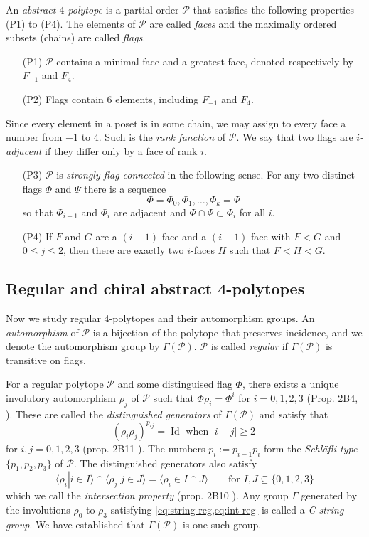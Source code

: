 \documentclass{article}
\theoremstyle{definition}
\newcommand{\p}{\mathcal{P}}
\DeclareMathOperator{\Id}{Id}
\begin{document}
	An \textit{abstract $4$-polytope} is a partial order $\p$ that satisfies the following properties (P1) to (P4). The elements of $\p$ are called \textit{faces} and the maximally ordered subsets (chains) are called \textit{flags}.
	\begin{enumerate}
		\item[(P1)]\label{P1} $\p$ contains a minimal face and a greatest face, denoted respectively by $F_{-1}$ and $F_4$.
		\item[(P2)]\label{P2} Flags contain $6$ elements, including $F_{-1}$ and $F_4$.
	\end{enumerate}
	Since every element in a poset is in some chain, we may assign to every face a number from $-1$ to $4$. Such is the \textit{rank function} of $\p$. We say that two flags are \textit{$i$-adjacent} if they differ only by a face of rank $i$.
	\begin{enumerate}
		\item[(P3)]\label{P3} $\p$ is \textit{strongly flag connected} in the following sense. For any two distinct flags $\Phi$ and $\Psi$ there is a sequence
		\[\Phi=\Phi_0,\Phi_1,\ldots,\Phi_k=\Psi\]
		so that $\Phi_{i-1}$ and $\Phi_i$ are adjacent and $\Phi\cap\Psi\subset\Phi_i$ for all $i$.
		\item[(P4)]\label{P4} If $F$ and $G$ are a $(i-1)$-face and a $(i+1)$-face with $F<G$ and $0\leq j\leq2$, then there are exactly two $i$-faces $H$ such that $F<H<G$.
	\end{enumerate}
	
		\subsection{Regular and chiral abstract 4-polytopes}
	Now we study regular 4-polytopes and their automorphism groups. An \textit{automorphism} of $\p$ is a bijection of the polytope that preserves incidence, and we denote the automorphism group by $\Gamma(\p)$. $\p$ is called \textit{regular} if $\Gamma(\p)$ is transitive on flags.
	
	For a regular polytope $\p$ and some distinguised flag $\Phi$, there exists a unique involutory automorphism $\rho_j$ of $\p$ such that $\Phi\rho_i=\Phi^i$ for $i=0,1,2,3$ (Prop. 2B4, \cite{abstract-polytopes}). These are called the \textit{distinguished generators} of $\Gamma(\p)$ and satisfy that 
	\begin{equation}\label{eq:string-reg}
			(\rho_i\rho_j)^{p_{ij}}=\Id\text{ when } |i-j|\geq2\
	\end{equation}
	for $i,j=0,1,2,3$ (prop. 2B11 \cite{abstract-polytopes}). The numbers $p_i:=p_{i-1}p_i$ form the \textit{Schläfli type} $\{p_1,p_2,p_3\}$ of $\p$. The distinguished generators also satisfy 
	\begin{equation}\label{eq:int-reg}
		\langle \rho_i|i\in I\rangle\cap\langle\rho_j|j\in J\rangle=\langle\rho_i\in I\cap J\rangle\qquad\text{for }I,J\subseteq\{0,1,2,3\}
	\end{equation}
	which we call the \textit{intersection property} (prop. 2B10 \cite{abstract-polytopes}). Any group $\Gamma$ generated by the involutions $\rho_0$ to $\rho_3$ satisfying \cref{eq:string-reg,eq:int-reg} is called a \textit{C-string group}. We have established that $\Gamma(\p)$ is one such group.
	
\end{document}
